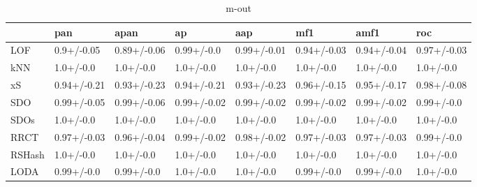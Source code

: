\begin{table}
\centering
\caption{m-out}
\begin{tabular}{llllllll}
\toprule
{} &          pan &         apan &           ap &          aap &          mf1 &         amf1 &          roc \\
\midrule
LOF    &   0.9+/-0.05 &  0.89+/-0.06 &   0.99+/-0.0 &  0.99+/-0.01 &  0.94+/-0.03 &  0.94+/-0.04 &  0.97+/-0.03 \\
kNN    &    1.0+/-0.0 &    1.0+/-0.0 &    1.0+/-0.0 &    1.0+/-0.0 &    1.0+/-0.0 &    1.0+/-0.0 &    1.0+/-0.0 \\
xS     &  0.94+/-0.21 &  0.93+/-0.23 &  0.94+/-0.21 &  0.93+/-0.23 &  0.96+/-0.15 &  0.95+/-0.17 &  0.98+/-0.08 \\
SDO    &  0.99+/-0.05 &  0.99+/-0.06 &  0.99+/-0.02 &  0.99+/-0.02 &  0.99+/-0.02 &  0.99+/-0.02 &   0.99+/-0.0 \\
SDOs   &    1.0+/-0.0 &    1.0+/-0.0 &    1.0+/-0.0 &    1.0+/-0.0 &    1.0+/-0.0 &    1.0+/-0.0 &    1.0+/-0.0 \\
RRCT   &  0.97+/-0.03 &  0.96+/-0.04 &  0.99+/-0.02 &  0.98+/-0.02 &  0.97+/-0.03 &  0.97+/-0.03 &   0.99+/-0.0 \\
RSHash &    1.0+/-0.0 &    1.0+/-0.0 &    1.0+/-0.0 &    1.0+/-0.0 &    1.0+/-0.0 &    1.0+/-0.0 &    1.0+/-0.0 \\
LODA   &   0.99+/-0.0 &   0.99+/-0.0 &    1.0+/-0.0 &    1.0+/-0.0 &   0.99+/-0.0 &   0.99+/-0.0 &    1.0+/-0.0 \\
\bottomrule
\end{tabular}
\end{table}
